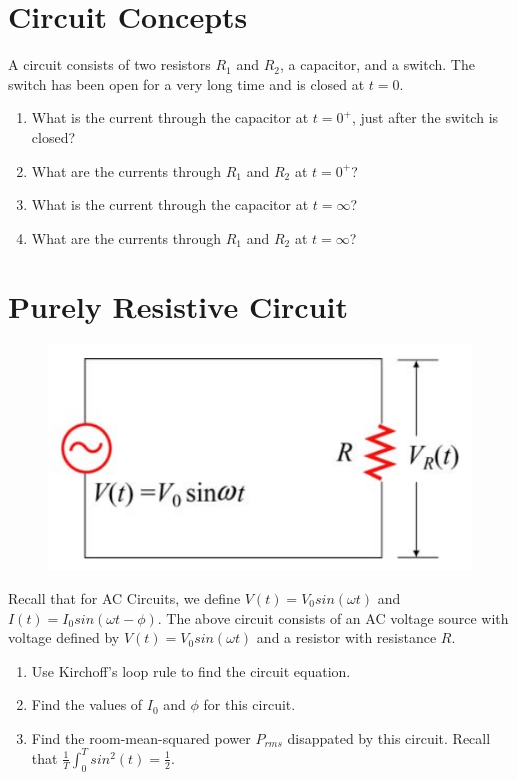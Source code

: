\documentclass[a4paper]{article}
\begin{document}
\section{Circuit Concepts}
A circuit consists of two resistors $R_1$ and $R_2$, a capacitor, and a switch. The switch has been open for a very long time and is closed at $t=0$.
\begin{enumerate}[itemsep=4mm,after=\vspace{4mm}]
    \item What is the current through the capacitor at $t=0^+$, just after the switch is closed?
    \item What are the currents through $R_1$ and $R_2$ at $t=0^+$?
    \item What is the current through the capacitor at $t = \infty$?
    \item What are the currents through $R_1$ and $R_2$ at $t=\infty$?
\end{enumerate}

\section{Purely Resistive Circuit}
\begin{figure}[h]
    \centering
    \includegraphics[scale=.5]{resistorcircuit.png}
    \label{fig:resistorcircuit}
\end{figure}

Recall that for AC Circuits, we define $V(t) = V_0 sin(\omega t)$ and $I(t) = I_0 sin(\omega t - \phi)$. The above circuit consists of an AC voltage source with voltage defined by $V(t) = V_0 sin(\omega t)$ and a resistor with resistance $R$. 

\begin{enumerate}[label=(\alph*), itemsep=5mm,after=\vspace{5mm}]
    \item Use Kirchoff's loop rule to find the circuit equation.
    \item Find the values of $I_0$ and $\phi$ for this circuit.
    \item Find the room-mean-squared power $P_{rms}$ disappated by this circuit. Recall that $\frac{1}{T}\int_0^T sin^2(t) = \frac{1}{2}$.
\end{enumerate}
\end{document}

